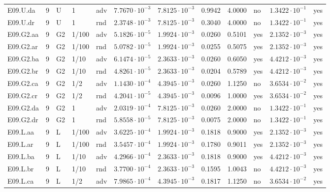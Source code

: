 {\begin{longtable}{@{}lllllllllll l@{}}
E09.U.da & 9 & U & 1 & adv & $7.7670\cdot 10^{-3}$ & $7.8125\cdot 10^{-3}$ & 0.9942 & 4.0000 & no & $1.3422\cdot 10^{-1}$ & yes \\
E09.U.dr & 9 & U & 1 & rnd & $2.3748\cdot 10^{-3}$ & $7.8125\cdot 10^{-3}$ & 0.3040 & 4.0000 & no & $1.3422\cdot 10^{-1}$ & yes \\
E09.G2.aa & 9 & G2 & 1/100 & adv & $5.1826\cdot 10^{-5}$ & $1.9924\cdot 10^{-3}$ & 0.0260 & 0.5101 & yes & $2.1352\cdot 10^{-3}$ & yes \\
E09.G2.ar & 9 & G2 & 1/100 & rnd & $5.0782\cdot 10^{-5}$ & $1.9924\cdot 10^{-3}$ & 0.0255 & 0.5075 & yes & $2.1352\cdot 10^{-3}$ & yes \\
E09.G2.ba & 9 & G2 & 1/10 & adv & $6.1474\cdot 10^{-5}$ & $2.3633\cdot 10^{-3}$ & 0.0260 & 0.6050 & yes & $4.4212\cdot 10^{-3}$ & yes \\
E09.G2.br & 9 & G2 & 1/10 & rnd & $4.8261\cdot 10^{-5}$ & $2.3633\cdot 10^{-3}$ & 0.0204 & 0.5789 & yes & $4.4212\cdot 10^{-3}$ & yes \\
E09.G2.ca & 9 & G2 & 1/2 & adv & $1.1430\cdot 10^{-4}$ & $4.3945\cdot 10^{-3}$ & 0.0260 & 1.1250 & no & $3.6534\cdot 10^{-2}$ & yes \\
E09.G2.cr & 9 & G2 & 1/2 & rnd & $4.2041\cdot 10^{-5}$ & $4.3945\cdot 10^{-3}$ & 0.0096 & 1.0000 & yes & $3.6534\cdot 10^{-2}$ & yes \\
E09.G2.da & 9 & G2 & 1 & adv & $2.0319\cdot 10^{-4}$ & $7.8125\cdot 10^{-3}$ & 0.0260 & 2.0000 & no & $1.3422\cdot 10^{-1}$ & yes \\
E09.G2.dr & 9 & G2 & 1 & rnd & $5.8558\cdot 10^{-5}$ & $7.8125\cdot 10^{-3}$ & 0.0075 & 2.0000 & no & $1.3422\cdot 10^{-1}$ & yes \\
E09.L.aa & 9 & L & 1/100 & adv & $3.6225\cdot 10^{-4}$ & $1.9924\cdot 10^{-3}$ & 0.1818 & 0.9000 & yes & $2.1352\cdot 10^{-3}$ & yes \\
E09.L.ar & 9 & L & 1/100 & rnd & $3.5457\cdot 10^{-4}$ & $1.9924\cdot 10^{-3}$ & 0.1780 & 0.9011 & yes & $2.1352\cdot 10^{-3}$ & yes \\
E09.L.ba & 9 & L & 1/10 & adv & $4.2966\cdot 10^{-4}$ & $2.3633\cdot 10^{-3}$ & 0.1818 & 0.9000 & yes & $4.4212\cdot 10^{-3}$ & yes \\
E09.L.br & 9 & L & 1/10 & rnd & $3.7700\cdot 10^{-4}$ & $2.3633\cdot 10^{-3}$ & 0.1595 & 1.0043 & no & $4.4212\cdot 10^{-3}$ & yes \\
E09.L.ca & 9 & L & 1/2 & adv & $7.9865\cdot 10^{-4}$ & $4.3945\cdot 10^{-3}$ & 0.1817 & 1.1250 & no & $3.6534\cdot 10^{-2}$ & yes \\

\end{longtable}}

